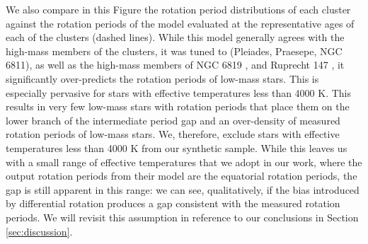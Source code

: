 We also compare in this Figure the rotation period distributions of each cluster against the rotation periods of the \citet{spada_competing_2020} model evaluated at the representative ages of each of the clusters (dashed lines).
While this model generally agrees with the high-mass members of the clusters, it was tuned to (Pleiades, Praesepe, NGC 6811), as well as the high-mass members of NGC 6819 \citep[2.5 Gyr;][]{meibom_kepler_2011}, and Ruprecht 147 \citep[2.7 Gyr;][]{curtis_when_2020}, it significantly over-predicts the rotation periods of low-mass stars.
This is especially pervasive for stars with effective temperatures less than 4000 K.
This results in very few low-mass stars with rotation periods that place them on the lower branch of the intermediate period gap and an over-density of measured rotation periods of low-mass stars.
We, therefore, exclude stars with effective temperatures less than 4000 K from our synthetic sample. 
While this leaves us with a small range of effective temperatures that we adopt in our work, where the output rotation periods from their model are the equatorial rotation periods, the gap is still apparent in this range: we can see, qualitatively, if the bias introduced by differential rotation produces a gap consistent with the measured rotation periods.
We will revisit this assumption in reference to our conclusions in Section \ref{sec:discussion}.

